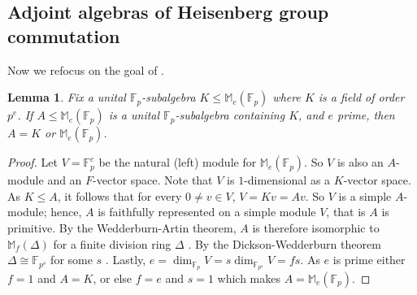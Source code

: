 \documentclass{toc}
\numberwithin{equation}{section}
\theoremstyle{plain}       %
\newtheorem{lem}[equation]{Lemma}
\theoremstyle{remark}
\theoremstyle{definition}
\numberwithin{figure}{section}
\numberwithin{table}{section}
\newcommand{\bbF}{\mathbb{F}}  %
\begin{document}
\subsection{Adjoint algebras of Heisenberg group commutation}

Now we refocus on the goal of . 
\begin{lem}\label{lem:Jac}
	Fix a unital $\bbF_p$-subalgebra $K\leq \mathbb{M}_e(\bbF_p)$ where $K$ is a
	field of order $p^e$.  If $A\leq \mathbb{M}_{e}(\bbF_p)$ is a unital
	$\bbF_p$-subalgebra containing $K$, and $e$ prime, then $A=K$ or
	$\mathbb{M}_e(\bbF_p)$.
\end{lem}
\begin{proof}
  Let $V=\bbF_p^e$ be the natural (left) module for $\mathbb{M}_e(\bbF_p)$. So
$V$ is also an $A$-module and an $F$-vector space.  Note that $V$ is
$1$-dimensional as a $K$-vector space.  As $K\leq A$, it follows that for every
$0\neq v\in V$, $V=Kv=Av$.  So $V$ is a simple $A$-module; hence, $A$ is
faithfully represented on a simple module $V$, that is $A$ is primitive.  By the
Wedderburn-Artin theorem, $A$ is therefore isomorphic to $\mathbb{M}_f(\Delta)$
for a finite division ring $\Delta$ \cite[p. 421]{Hungerford}. By the
Dickson-Wedderburn theorem $\Delta\cong \bbF_{p^s}$ for some $s$ \cite[p.
462]{Hungerford}. Lastly, $e=\dim_{\bbF_p} V=s\dim_{\bbF_{p^s}} V=fs$.  As $e$
is prime either $f=1$ and $A=K$, or else $f=e$ and $s=1$ which makes
$A=\mathbb{M}_e(\bbF_p)$.  
\end{proof}
\end{document}
